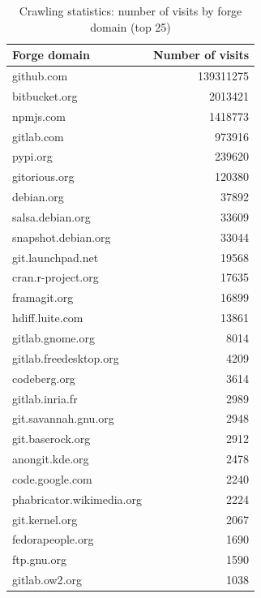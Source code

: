\begin{table}
    \caption{Crawling statistics: number of visits by forge domain (top 25)}
  \label{tab:visits-by-domain}
  \centering
  \begin{tabular}{l|r}
    \textbf{Forge domain} & \textbf{Number of visits}
    \\\hline
    github.com                 & \num{139311275} \\
    bitbucket.org              &   \num{2013421} \\
    npmjs.com                  &   \num{1418773} \\
    gitlab.com                 &    \num{973916} \\
    pypi.org                   &    \num{239620} \\
    gitorious.org              &    \num{120380} \\
    debian.org                 &     \num{37892} \\
    salsa.debian.org           &     \num{33609} \\
    snapshot.debian.org        &     \num{33044} \\
    git.launchpad.net          &     \num{19568} \\
    cran.r-project.org         &     \num{17635} \\
    framagit.org               &     \num{16899} \\
    hdiff.luite.com            &     \num{13861} \\
    gitlab.gnome.org           &      \num{8014} \\
    gitlab.freedesktop.org     &      \num{4209} \\
    codeberg.org               &      \num{3614} \\
    gitlab.inria.fr            &      \num{2989} \\
    git.savannah.gnu.org       &      \num{2948} \\
    git.baserock.org           &      \num{2912} \\
    anongit.kde.org            &      \num{2478} \\
    code.google.com            &      \num{2240} \\
    phabricator.wikimedia.org  &      \num{2224} \\
    git.kernel.org             &      \num{2067} \\
    fedorapeople.org           &      \num{1690} \\
    ftp.gnu.org                &      \num{1590} \\
    gitlab.ow2.org             &      \num{1038} \\
  \end{tabular}
\end{table}



